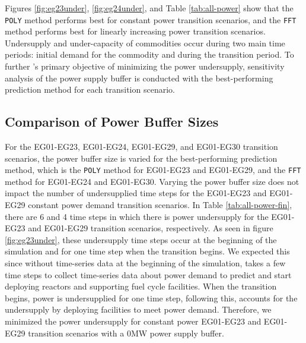 Figures \ref{fig:eg23under}, \ref{fig:eg24under}, and Table 
\ref{tab:all-power} show that the \texttt{POLY} method 
performs best for constant power transition scenarios, 
and the \texttt{FFT} method performs best for linearly increasing 
power transition scenarios. 
Undersupply and under-capacity of commodities occur during two main time periods: 
initial demand for the commodity and during the transition period.
To further \deploy's primary objective of minimizing the power undersupply, 
sensitivity analysis of the power supply buffer is conducted 
with the best-performing prediction method for each transition scenario.  

\subsection{Comparison of Power Buffer Sizes}
For the EG01-EG23, EG01-EG24, EG01-EG29, and EG01-EG30 transition scenarios, 
the power buffer size is varied for the best-performing prediction method, 
which is the \texttt{POLY} method for EG01-EG23 and EG01-EG29, and the 
\texttt{FFT} method for EG01-EG24 and EG01-EG30. 
Varying the power buffer size does not impact the number of 
undersupplied time steps for the EG01-EG23 and EG01-EG29 constant 
power demand transition scenarios.
In Table \ref{tab:all-power-fin}, there are 6 and 4 time steps
in which there is power undersupply for the EG01-EG23 and EG01-EG29 
transition scenarios, respectively. 
As seen in figure \ref{fig:eg23under}, these undersupply time 
steps occur at the beginning of the simulation and for one 
time step when the transition begins. 
We expected this since without time-series data 
at the beginning of the simulation, \deploy takes a few 
time steps to collect time-series data about power demand 
to predict and start deploying reactors and supporting 
fuel cycle facilities. 
When the transition begins, power is undersupplied for one 
time step, following this, \deploy accounts for the 
undersupply by deploying facilities to meet power demand.
Therefore, we minimized the power undersupply for constant 
power EG01-EG23 and EG01-EG29 transition scenarios with 
a 0MW power supply buffer. 

